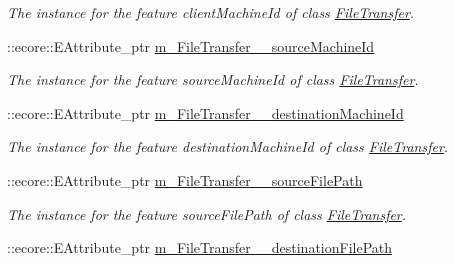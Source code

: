 \begin{DoxyCompactItemize}
\begin{DoxyCompactList}\small\item\em The instance for the feature clientMachineId of class \hyperlink{classFMS__Data_1_1FileTransfer}{FileTransfer}. \item\end{DoxyCompactList}\item 
\hypertarget{classFMS__Data_1_1FMS__DataPackage_a6afdef9e9db767b5b9adc576372a7b2d}{
::ecore::EAttribute\_\-ptr \hyperlink{classFMS__Data_1_1FMS__DataPackage_a6afdef9e9db767b5b9adc576372a7b2d}{m\_\-FileTransfer\_\-\_\-sourceMachineId}}
\label{classFMS__Data_1_1FMS__DataPackage_a6afdef9e9db767b5b9adc576372a7b2d}

\begin{DoxyCompactList}\small\item\em The instance for the feature sourceMachineId of class \hyperlink{classFMS__Data_1_1FileTransfer}{FileTransfer}. \item\end{DoxyCompactList}\item 
\hypertarget{classFMS__Data_1_1FMS__DataPackage_a6ecce91e999bb3ce20691df0b690cf45}{
::ecore::EAttribute\_\-ptr \hyperlink{classFMS__Data_1_1FMS__DataPackage_a6ecce91e999bb3ce20691df0b690cf45}{m\_\-FileTransfer\_\-\_\-destinationMachineId}}
\label{classFMS__Data_1_1FMS__DataPackage_a6ecce91e999bb3ce20691df0b690cf45}

\begin{DoxyCompactList}\small\item\em The instance for the feature destinationMachineId of class \hyperlink{classFMS__Data_1_1FileTransfer}{FileTransfer}. \item\end{DoxyCompactList}\item 
\hypertarget{classFMS__Data_1_1FMS__DataPackage_ad257ffdf1d4068712bddb8a9df4d52cd}{
::ecore::EAttribute\_\-ptr \hyperlink{classFMS__Data_1_1FMS__DataPackage_ad257ffdf1d4068712bddb8a9df4d52cd}{m\_\-FileTransfer\_\-\_\-sourceFilePath}}
\label{classFMS__Data_1_1FMS__DataPackage_ad257ffdf1d4068712bddb8a9df4d52cd}

\begin{DoxyCompactList}\small\item\em The instance for the feature sourceFilePath of class \hyperlink{classFMS__Data_1_1FileTransfer}{FileTransfer}. \item\end{DoxyCompactList}\item 
\hypertarget{classFMS__Data_1_1FMS__DataPackage_ac96257c0a8c60e8059a4e58bf42e2a4a}{
::ecore::EAttribute\_\-ptr \hyperlink{classFMS__Data_1_1FMS__DataPackage_ac96257c0a8c60e8059a4e58bf42e2a4a}{m\_\-FileTransfer\_\-\_\-destinationFilePath}}
\label{classFMS__Data_1_1FMS__DataPackage_ac96257c0a8c60e8059a4e58bf42e2a4a}


\end{DoxyCompactItemize}
